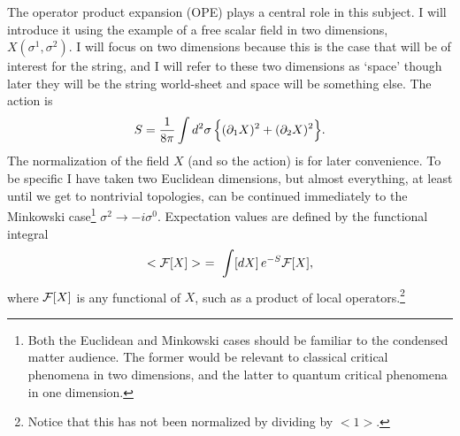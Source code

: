
The operator product expansion (OPE) plays a central role in this
subject.  I will introduce it using the example of a free scalar
field in two dimensions, $X(\sigma^1,\sigma^2)$.  
I will focus on two dimensions because this is the case that will
be of interest for the string, and I will refer to these two
dimensions as `space' though later they will be the string
world-sheet and space will be something else.  The action is
\begin{equation}
S= \frac{1}{8\pi} \int d^2\sigma\,
\Bigl\{ (\partial_1 X)^2 + (\partial_2
X)^2 \Bigr\}. \label{xact}
\end{equation}
The normalization of the field $X$ (and so the action) is for later
convenience.  To be specific I have taken two Euclidean dimensions,
but almost everything, at least until we get to nontrivial
topologies, can be continued immediately to the Minkowski
case\footnote{Both the Euclidean and Minkowski cases should be
familiar to the condensed matter audience.  The former would be
relevant to classical critical phenomena in two dimensions, and the
latter to quantum critical phenomena in one dimension.}
$\sigma^2 \to -i \sigma^0$.  Expectation values are defined by the
functional integral
\begin{equation}
< {\cal F}[X] > \ =\ \int [dX]\, e^{-S} {\cal F}[X],
\end{equation}
where ${\cal F}[X]$ is any functional of $X$, such as a product of
local operators.\footnote{Notice that this has not been normalized
by dividing by $< 1 >$.}

